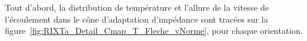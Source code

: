 %
%
%
%

Tout d'abord, la distribution de température et l'allure de la vitesse de l'écoulement dans le cône d'adaptation d'impédance sont tracées sur la figure~\ref{fig:RIXTa_Detail_Cmap_T_Fleche_vNorme}, pour chaque orientation.\medskip


